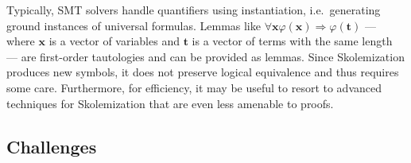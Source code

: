 \documentclass{llncs}
\begin{document}
Typically, SMT solvers handle quantifiers using instantiation, i.e.\ generating
ground instances of universal formulas.  Lemmas like $\forall \mathbf{x}
\varphi(\mathbf{x}) \Rightarrow \varphi(\mathbf{t})$ --- where $\mathbf{x}$ is a
vector of variables and $\mathbf{t}$ is a vector of terms with the same length
--- are first-order tautologies and can be provided as lemmas.  Since
Skolemization produces new symbols, it does not preserve logical equivalence and
thus requires some care.  Furthermore, for efficiency, it may be useful to resort to
advanced techniques for Skolemization that are even less amenable to proofs.











\subsection*{Challenges}
\end{document}
